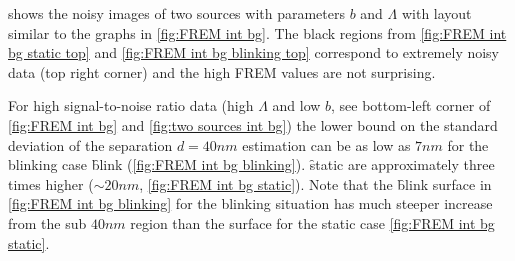 %
 shows the noisy images of two sources with parameters $b$ and $\Lambda$ with layout similar to the graphs in \autoref{fig:FREM int bg}.  The black regions from \autoref{fig:FREM int bg static top} and \autoref{fig:FREM int bg blinking top} correspond to extremely noisy data (top right corner) and the high FREM values are not surprising. 

For high signal-to-noise ratio data (high $\Lambda$ and low $b$,  see bottom-left corner of \autoref{fig:FREM int bg} and \autoref{fig:two sources int bg}) the lower bound on the standard deviation of the separation $d=40\unit{nm}$ estimation can be as low as $7\unit{nm}$ for the blinking case \f{blink} (\autoref{fig:FREM int bg blinking}). \f{static} are approximately three times higher ($\sim 20\unit{nm}$,  \autoref{fig:FREM int bg static}). Note that the \f{blink} surface in \autoref{fig:FREM int bg blinking} for the blinking situation has much steeper increase from the sub $40\unit{nm}$ region than the surface for the static case \autoref{fig:FREM int bg static}.

